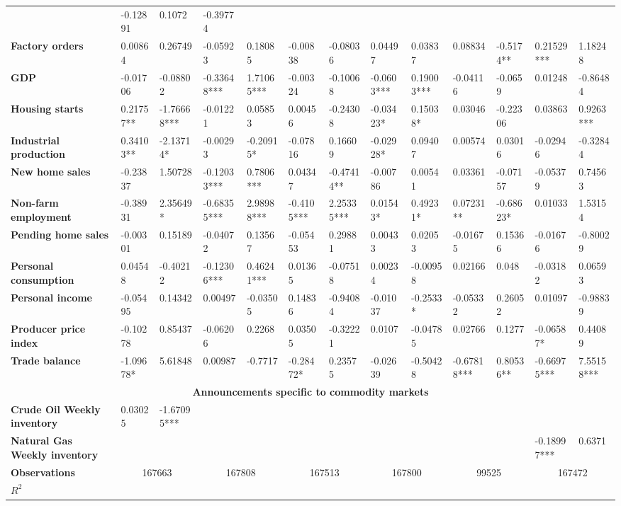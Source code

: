 \begin{sidewaystable}
{\begin{tabular}{@{}lllllllllllll@{}}
& -0.12891 & 0.1072 & -0.39774 \\ \textbf{Factory orders}& 0.00864 & 0.26749 & -0.05923 & 0.18085 & -0.00838 & -0.08036 & 0.04497 & 0.03837 & 0.08834 & -0.5174** & 0.21529*** & 1.18248 \\ \textbf{GDP}& -0.01706 & -0.08802 & -0.33648*** & 1.71065*** & -0.00324 & -0.10068 & -0.0603*** & 0.19003*** & -0.04116 & -0.0659 & 0.01248 & -0.86484 \\ \textbf{Housing starts}& 0.21757**& -1.76668***& -0.01221 & 0.05853 & 0.00456 & -0.24308 & -0.03423* & 0.15038* & 0.03046 & -0.22306 & 0.03863 & 0.9263*** \\ \textbf{Industrial production}& 0.34103**& -2.13714*& -0.00293 & -0.20915* & -0.07816 & 0.16609 & -0.02928* & 0.09407 & 0.00574 & 0.03016 & -0.02946 & -0.32844 \\ \textbf{New home sales}& -0.23837 & 1.50728 & -0.12033***& 0.7806***& 0.04347 & -0.47414** & -0.00786 & 0.00541 & 0.03361 & -0.07157 & -0.05379 & 0.74563 \\ \textbf{Non-farm employment}& -0.38931 & 2.35649* & -0.68355*** & 2.98988*** & -0.4105*** & 2.25335*** & 0.01543* & 0.49231* & 0.07231** & -0.68623* & 0.01033 & 1.53154 \\ \textbf{Pending home sales}& -0.00301 & 0.15189 & -0.04072 & 0.13567 & -0.05453 & 0.29881 & 0.00433 & 0.02053 & -0.01675 & 0.15366 & -0.01676 & -0.80029 \\ \textbf{Personal consumption}& 0.04548 & -0.40212 & -0.12306*** & 0.46241*** & 0.01365 & -0.07518 & 0.00234 & -0.00958 & 0.02166 & 0.048 & -0.03182 & 0.06593 \\ \textbf{Personal income}& -0.05495 & 0.14342 & 0.00497 & -0.03505 & 0.14836 & -0.94084 & -0.01037 & -0.2533* & -0.05332 & 0.26052 & 0.01097 & -0.98839 \\ \textbf{Producer price index}& -0.10278 & 0.85437 & -0.06206 & 0.2268 & 0.03505 & -0.32221 & 0.0107 & -0.04785 & 0.02766 & 0.1277 & -0.06587* & 0.44089 \\ \textbf{Trade balance}& -1.09678* & 5.61848 & 0.00987 & -0.7717 & -0.28472* & 0.23575 & -0.02639 & -0.50428 & -0.67818*** & 0.80536** & -0.66975*** & 7.55158*** \\  \midrule \multicolumn{13}{c}{\textbf{Announcements specific to commodity markets}} \\ \midrule \textbf{Crude Oil Weekly inventory}& 0.03025 & -1.67095*** &  &  &  &  &  &  &  &  &  &  \\ \textbf{Natural Gas Weekly inventory}&  &  &  &  &  &  &  &  &  &  & -0.18997*** & 0.6371 \\  \midrule \textbf{Observations}             &\multicolumn{2}{c}{ 167663 }                                                 & \multicolumn{2}{c}{ 167808 }                                                 & \multicolumn{2}{c}{ 167513 }                                                 & \multicolumn{2}{c}{ 167800 }                                                 & \multicolumn{2}{c}{ 99525 }                                                   & \multicolumn{2}{c}{ 167472 }                                                 \\ \textbf{$R^2$}             
\end{tabular}}
\end{sidewaystable}
